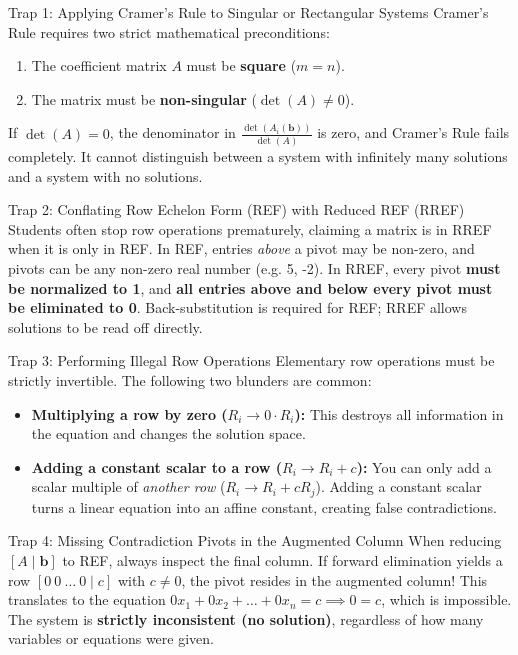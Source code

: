 \begin{trapbox}{Trap 1: Applying Cramer's Rule to Singular or Rectangular Systems}
Cramer's Rule requires two strict mathematical preconditions:
\begin{enumerate}
    \item The coefficient matrix $A$ must be \textbf{square} ($m = n$).
    \item The matrix must be \textbf{non-singular} ($\det(A) \neq 0$).
\end{enumerate}
If $\det(A) = 0$, the denominator in $\frac{\det(A_i(\mathbf{b}))}{\det(A)}$ is zero, and Cramer's Rule fails completely. It cannot distinguish between a system with infinitely many solutions and a system with no solutions.
\end{trapbox}

\begin{trapbox}{Trap 2: Conflating Row Echelon Form (REF) with Reduced REF (RREF)}
Students often stop row operations prematurely, claiming a matrix is in RREF when it is only in REF.
In REF, entries \textit{above} a pivot may be non-zero, and pivots can be any non-zero real number (e.g. 5, -2). 
In RREF, every pivot \textbf{must be normalized to 1}, and \textbf{all entries above and below every pivot must be eliminated to 0}. Back-substitution is required for REF; RREF allows solutions to be read off directly.
\end{trapbox}

\begin{trapbox}{Trap 3: Performing Illegal Row Operations}
Elementary row operations must be strictly invertible. The following two blunders are common:
\begin{itemize}
    \item \textbf{Multiplying a row by zero ($R_i \to 0 \cdot R_i$):} This destroys all information in the equation and changes the solution space.
    \item \textbf{Adding a constant scalar to a row ($R_i \to R_i + c$):} You can only add a scalar multiple of \textit{another row} ($R_i \to R_i + c R_j$). Adding a constant scalar turns a linear equation into an affine constant, creating false contradictions.
\end{itemize}
\end{trapbox}

\begin{trapbox}{Trap 4: Missing Contradiction Pivots in the Augmented Column}
When reducing $[A \mid \mathbf{b}]$ to REF, always inspect the final column.
If forward elimination yields a row $[0 \ 0 \ \dots \ 0 \mid c]$ with $c \neq 0$, the pivot resides in the augmented column! This translates to the equation $0 x_1 + 0 x_2 + \dots + 0 x_n = c \implies 0 = c$, which is impossible. The system is \textbf{strictly inconsistent (no solution)}, regardless of how many variables or equations were given.
\end{trapbox}

